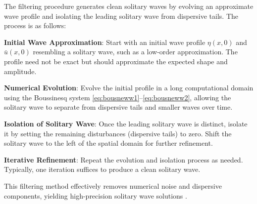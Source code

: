 \documentclass[alpha-refs, 12pt]{wiley-article}
\begin{document}
The filtering procedure generates clean solitary waves by evolving an approximate wave profile and isolating the leading solitary wave from dispersive tails. The process is as follows:
\begin{description}
  \item{\textbf{Initial Wave Approximation}:} Start with an initial wave profile $\eta(x,0)$ and $\bar{u}(x,0)$ resembling a solitary wave, such as a low-order approximation. The profile need not be exact but should approximate the expected shape and amplitude.
  \item{\textbf{Numerical Evolution}:} Evolve the initial profile in a long computational domain using the Boussinesq system \eqref{eq:bousneww1}--\eqref{eq:bousneww2}, allowing the solitary wave to separate from dispersive tails and smaller waves over time.
  \item{\textbf{Isolation of Solitary Wave}:} Once the leading solitary wave is distinct, isolate it by setting the remaining disturbances (dispersive tails) to zero. Shift the solitary wave to the left of the spatial domain for further refinement.
  \item{\textbf{Iterative Refinement}:} Repeat the evolution and isolation process as needed. Typically, one iteration suffices to produce a clean solitary wave.
\end{description}
This filtering method effectively removes numerical noise and dispersive components, yielding high-precision solitary wave solutions \citep{BDM2}.
\end{document}
